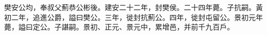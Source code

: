 \begin{pinyinscope}
 
 
 樊安公均，奉叔父薊恭公彬後。建安二十二年，封樊侯。二十四年薨。子抗嗣。黃初二年，追進公爵，謚曰樊公。三年，徙封抗薊公。四年，徙封屯留公。景初元年薨，謚曰定公。子諶嗣。景初、正元、景元中，累增邑，并前千九百戶。
 
 
\end{pinyinscope}